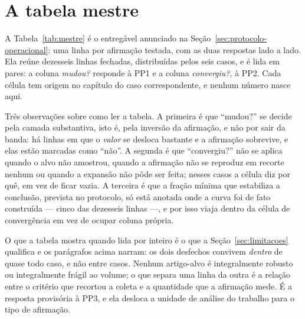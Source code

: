 \section{A tabela mestre}
\label{sec:tabela-mestre}

A Tabela~\ref{tab:mestre} é o entregável anunciado na Seção~\ref{sec:protocolo-operacional}:
uma linha por afirmação testada, com as duas respostas lado a lado. Ela reúne dezesseis linhas fechadas, distribuídas pelos seis casos, e é lida em pares: a coluna
\emph{mudou?} responde à PP1 e a coluna \emph{convergiu?}, à PP2. Cada célula tem
origem no capítulo do caso correspondente, e nenhum número nasce aqui.

Três observações sobre como ler a tabela. A primeira é que ``mudou?'' se decide pela
camada substantiva, isto é, pela inversão da afirmação, e não por sair da banda: há
linhas em que o \emph{valor} se desloca bastante e a afirmação sobrevive, e elas estão
marcadas como ``não''. A segunda é que ``convergiu?'' não se aplica quando o alvo não
amostrou, quando a afirmação não se reproduz em recorte nenhum ou quando a expansão não
pôde ser feita; nesses casos a célula diz por quê, em vez de ficar vazia. A terceira é
que a fração mínima que estabiliza a conclusão, prevista no protocolo, só está anotada
onde a curva foi de fato construída --- cinco das dezesseis linhas ---, e por isso viaja dentro da célula de convergência em vez de ocupar coluna própria.

O que a tabela mostra quando lida por inteiro é o que a Seção~\ref{sec:limitacoes}
qualifica e os parágrafos acima narram: os dois desfechos convivem \emph{dentro} de
quase todo caso, e não entre casos. Nenhum artigo-alvo é integralmente robusto ou
integralmente frágil ao volume; o que separa uma linha da outra é a relação entre o
critério que recortou a coleta e a quantidade que a afirmação mede. É a resposta
provisória à PP3, e ela desloca a unidade de análise do trabalho para o tipo de
afirmação.

